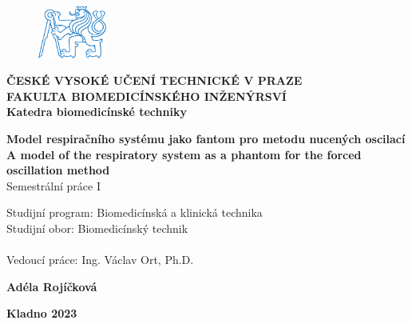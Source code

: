 \documentclass[a4paper,12pt]{article}   %
\numberwithin{equation}{section}        %
\newcommand{\autor}{Adéla Rojíčková}
\newcommand{\vedouci}{Ing. Václav Ort, Ph.D.}
\newcommand{\nazev}{Model respiračního systému jako fantom pro metodu nucených oscilací}
\newcommand{\nazevENG}{A model of the respiratory system as a phantom for the forced oscillation method}
\newcommand{\typ}{Semestrální práce I}
\newcommand{\rok}{2023}
\newcommand{\program}{Biomedicínská a klinická technika}
\newcommand{\obor}{Biomedicínský technik}       %
\begin{document}
    
	\pagestyle{empty}

	\begin{titlepage}
 		\begin{center}
 		\begin{figure}[!h]
			\centering
 			\includegraphics[width=0.2\textwidth]{symbol_cvut_konturova_verze}
 		\end{figure}
 		\textsf{\large{\textbf{ČESKÉ VYSOKÉ UČENÍ TECHNICKÉ V PRAZE}}}\\
         {\color{NavyBlue}\makebox[\linewidth]{\rule{\textwidth}{0.4mm}}}
 		\textsf{\normalsize{\textbf{FAKULTA BIOMEDICÍNSKÉHO INŽENÝRSVÍ}}}\\
		\textsf{\textbf{Katedra biomedicínské techniky}}\\	
		
		\vfill
 		
		\textsf{\Large{\textbf{\nazev}}}\\
	    \vspace{24pt}
		\textsf{\Large{\textbf{\nazevENG}}}\\
		\vspace{24pt}
		\textsf{\typ}\\ 
		\vfill
		\end{center}
		\textsf{Studijní program: \program} \\
		\textsf{Studijní obor: \obor} \\ %
		\\
		\textsf{Vedoucí práce: \vedouci}\\
				
		\begin{center}
		\textsf{\textbf{\autor}} \\ [0.5cm] 
		
		{\color{NavyBlue}\makebox[\linewidth]{\rule{\textwidth}{0.4mm}}} 
 		
		\textsf{\textbf{Kladno \rok}}
		\end{center}
			

		\clearpage


	\end{titlepage}
\end{document}
